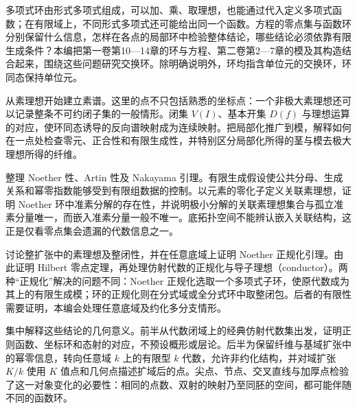 

\BookPartGuide
多项式环由形式多项式组成，可以加、乘、取理想，也能通过代入定义多项式函数；在有限域上，不同形式多项式还可能给出同一个函数。方程的零点集与函数环分别保留什么信息，怎样在各点的局部环中检验整体结论，哪些结论必须依靠有限生成条件？本编把第一卷第10—14章的环与方程、第二卷第2—7章的模及其构造结合起来，围绕这些问题研究交换环。除明确说明外，环均指含单位元的交换环，环同态保持单位元。

\ProseParagraphBreak
{}从素理想开始建立素谱。这里的点不只包括熟悉的坐标点：一个非极大素理想还可以记录整条不可约闭子集的一般情形。闭集 \(V(I)\)、基本开集 \(D(f)\) 与理想运算的对应，使环同态诱导的反向谱映射成为连续映射。把局部化推广到模，解释如何在一点处检查零元、正合性和有限生成性，并特别区分局部化所得的茎与模去极大理想所得的纤维。

\ProseParagraphBreak
{}整理 Noether 性、Artin 性及 Nakayama 引理。有限生成假设使公共分母、生成关系和幂零指数能够受到有限组数据的控制。以元素的零化子定义关联素理想，证明 Noether 环中准素分解的存在性，并说明极小分解的关联素理想集合与孤立准素分量唯一，而嵌入准素分量一般不唯一。底拓扑空间不能辨认嵌入关联结构，这正是仅看零点集会遗漏的代数信息之一。

\ProseParagraphBreak
{}讨论整扩张中的素理想及整闭性，并在任意底域上证明 Noether 正规化引理。由此证明 Hilbert 零点定理，再处理仿射代数的正规化与导子理想（conductor）。两种“正规化”解决的问题不同：Noether 正规化选取一个多项式子环，使原代数成为其上的有限生成模；环的正规化则在分式域或全分式环中取整闭包。后者的有限性需要证明，本编会处理任意底域及约化多分支情形。

\ProseParagraphBreak
{}集中解释这些结论的几何意义。前半从代数闭域上的经典仿射代数集出发，证明正则函数、坐标环和态射的对应，不预设概形或层论。后半为保留纤维与基域扩张中的幂零信息，转向任意域 \(k\) 上的有限型 \(k\) 代数，允许非约化结构，并对域扩张 \(K/k\) 使用 \(K\) 值点和几何点描述扩域后的点。尖点、节点、交叉直线与加厚点检验了这一对象变化的必要性：相同的点数、双射的映射乃至同胚的空间，都可能伴随不同的函数环。

